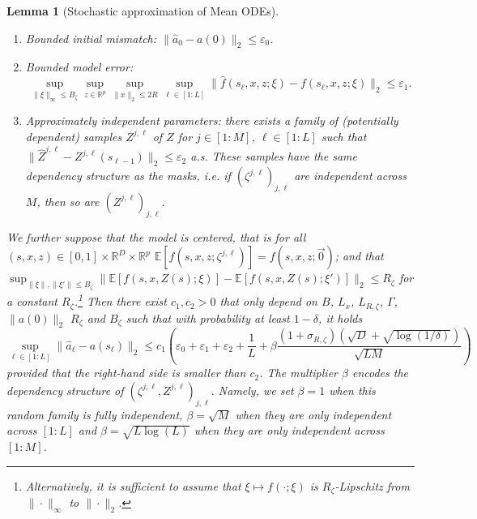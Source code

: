 \documentclass[a4paper,11pt]{article}
\newcommand{\R}{\mathbb{R}}
\newcommand{\1}{\mathbbm{1}}
\newcommand{\E}{\mathbb{E}}
\newtheorem{lemma}[theorem]{Lemma}
\theoremstyle{definition}
\theoremstyle{remark}
\begin{document}
\begin{lemma}[Stochastic approximation of Mean ODEs]
\begin{enumerate}
  \item \label{lem:stoch_approx_assi} Bounded initial mismatch: $\|\hat{a}_0 - a(0)\|_2 \leq \varepsilon_0$.
  \item \label{lem:stoch_approx_assii} Bounded model error:
        \[{\sup_{\|\xi\|_{\infty}\leq B_\zeta }}\sup_{z \in \R^p} \sup_{\|x\|_2 \leq 2R} \sup_{\ell \in [1:L]}
        \|\hat{f}(s_\ell, x, z{;\xi}) - f(s_\ell, x, z; {\xi})\|_2 \leq \varepsilon_1.\]
  \item \label{lem:stoch_approx_assiii}Approximately independent parameters: there exists a family of (potentially dependent)
        samples $Z^{j,\ell}$ of $Z$ for $j \in [1:M]$, $\ell \in [1:L]$ such that
        $\|\hat{Z}^{j,\ell} - Z^{j,\ell}(s_{\ell-1})\|_2 \leq \varepsilon_2$ a.s. These samples have the same dependency structure as the masks, i.e. if $(\zeta^{j,\ell})_{j,\ell}$ are independent across $M$, then so are $(Z^{j,\ell})_{j,\ell}$.
\end{enumerate}
We further suppose that the model is centered, that is for all $(s,x,z) \in [0,1]\times\R^D\times\R^p$ $\E[f(s,x,z;\zeta^{j,\ell})] = f(s,x,z;\vec{0})$; and that $\sup_{\|\xi\|,\|\xi'\|\leq B_\zeta}\|\E[f(s,x,Z(s);\xi)] -\E[f(s,x,Z(s);\xi')]\|_2 \leq R_{\zeta}$ for a constant $R_{\zeta}$.\footnote{Alternatively, it is sufficient to assume that $\xi \mapsto f(\cdot; \xi)$ is $R_{\zeta}$-Lipschitz from $\|\cdot\|_\infty$ to $\|\cdot\|_2$.}
Then there exist $c_1, c_2 > 0$ that only depend on $B$, $L_x$, $L_{{R,\zeta}}$, $\Gamma$,
$\|a(0)\|_2$ {$R_{\zeta}$ and $B_\zeta$} such that with probability at least $1 - \delta$, it holds
\[
  \sup_{\ell \in [1:L]} \|\hat{a}_\ell - a(s_\ell)\|_2
  \leq {c_1} \left(
    \varepsilon_0 + \varepsilon_1 + \varepsilon_2 
    + \frac{1}{L}
    +  {\beta}\frac{{(1+\sigma_{R,\zeta})}(\sqrt{D} + \sqrt{\log(1/\delta)} )}{\sqrt{LM}}
  \right)
\]
provided that the right-hand side is smaller than $c_2$. {The multiplier $\beta$ encodes the dependency structure of $(\zeta^{j,\ell}, Z^{j,\ell})_{j,\ell}$. Namely, we set $\beta =1$ when this random family is fully independent, $\beta = \sqrt{M}$ when they are only independent across $[1:L]$ and $\beta=\sqrt{L\log(L)}$ when they are only independent across $[1:M]$.}
\end{lemma}
\end{document}
